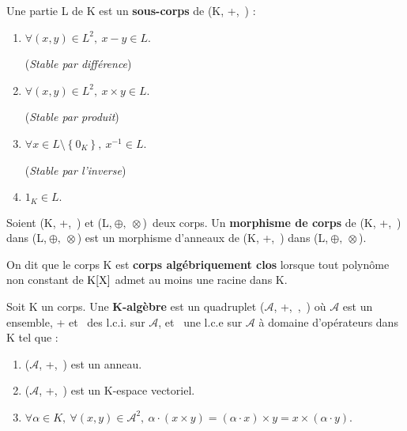 \noindent Une partie L de K est un \textbf{sous-corps} de (K, +,\ \x) \ssi :
\begin{enumerate}[leftmargin=2cm]
    \item \(\forall(x,y)\in L^2,\ x-y\in L \). \ \;
    \begin{small}
        (\emph{Stable par différence})
    \end{small}\vspace{0.1cm}

    \item \(\forall(x,y)\in L^2,\ x\times y\in L \). \ \;
    \begin{small}
        (\emph{Stable par produit})
    \end{small}\vspace{0.1cm}

    \item \( \forall x\in L\setminus \left\{0_K\right\},\ x^{-1}\in L \). \ \
    \begin{small}
        (\emph{Stable par l'inverse})
    \end{small}\vspace{0.1cm}

    \item \(1_K\in L.\)
\end{enumerate}
\vspace{1cm}

Soient (K, +,\ \x) et (L,\(\ \oplus ,\ \otimes \))\, deux corps. Un \textbf{morphisme de corps} de (K, +,\ \x) dans (L,\(\ \oplus ,\ \otimes \)) est un morphisme d'anneaux de (K, +,\ \x) dans (L,\(\ \oplus ,\ \otimes \)).

\vspace{1cm}

On dit que le corps K est \textbf{corps algébriquement clos} lorsque tout polynôme non constant de $\text{K}[\text{X}]$ admet au moins une racine dans K.



\vspace{1.2cm}

Soit K un corps. Une \textbf{K-algèbre} est un quadruplet (\(\mathcal{A}\), +,\ \x,\ \lce) où \(\mathcal{A}\) est un ensemble, + et \x \ des l.c.i. sur \(\mathcal{A}\), et \lce \ une l.c.e sur \(\mathcal{A}\) à domaine d'opérateurs dans K tel que :
\begin{enumerate}[leftmargin=2cm]
    \item (\(\mathcal{A}\), +,\ \x) est un anneau. \vspace{0.1cm}

    \item (\(\mathcal{A}\), +,\ \lce) est un K-espace vectoriel. \vspace{0.1cm}

    \item \( \forall \alpha \in K,\ \forall (x,y)\in \mathcal{A}^2,\ \alpha \cdot (x\times y) = (\alpha \cdot x) \times y = x\times (\alpha \cdot y).\)
\end{enumerate}

